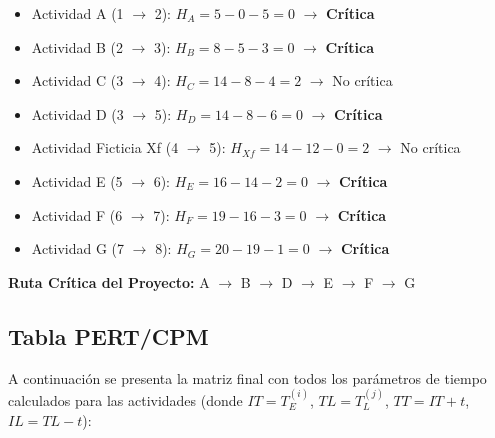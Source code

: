 \documentclass[12pt]{article}
\begin{document}
\begin{itemize}
    \item Actividad A (1 $\rightarrow$ 2): $H_A = 5 - 0 - 5 = 0$ $\rightarrow$ \textbf{Crítica}
    \item Actividad B (2 $\rightarrow$ 3): $H_B = 8 - 5 - 3 = 0$ $\rightarrow$ \textbf{Crítica}
    \item Actividad C (3 $\rightarrow$ 4): $H_C = 14 - 8 - 4 = 2$ $\rightarrow$ No crítica
    \item Actividad D (3 $\rightarrow$ 5): $H_D = 14 - 8 - 6 = 0$ $\rightarrow$ \textbf{Crítica}
    \item Actividad Ficticia Xf (4 $\rightarrow$ 5): $H_{Xf} = 14 - 12 - 0 = 2$ $\rightarrow$ No crítica
    \item Actividad E (5 $\rightarrow$ 6): $H_E = 16 - 14 - 2 = 0$ $\rightarrow$ \textbf{Crítica}
    \item Actividad F (6 $\rightarrow$ 7): $H_F = 19 - 16 - 3 = 0$ $\rightarrow$ \textbf{Crítica}
    \item Actividad G (7 $\rightarrow$ 8): $H_G = 20 - 19 - 1 = 0$ $\rightarrow$ \textbf{Crítica}
\end{itemize}

\textbf{Ruta Crítica del Proyecto:} A $\rightarrow$ B $\rightarrow$ D $\rightarrow$ E $\rightarrow$ F $\rightarrow$ G

\subsection{Tabla PERT/CPM}
A continuación se presenta la matriz final con todos los parámetros de tiempo calculados para las actividades (donde $IT=T_E^{(i)}$, $TL=T_L^{(j)}$, $TT=IT+t$, $IL=TL-t$):
\end{document}
